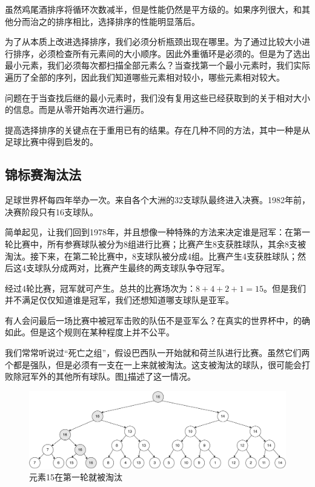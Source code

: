 \documentclass[b5paper]{ctexart}
\begin{document}
虽然鸡尾酒排序将循环次数减半，但是性能仍然是平方级的。如果序列很大，和其他分而治之的排序相比，选择排序的性能明显落后。

为了从本质上改进选择排序，我们必须分析瓶颈出现在哪里。为了通过比较大小进行排序，必须检查所有元素间的大小顺序。因此外重循环是必须的。但是为了选出最小元素，我们必须每次都扫描全部元素么？当查找第一个最小元素时，我们实际遍历了全部的序列，因此我们知道哪些元素相对较小，哪些元素相对较大。

问题在于当查找后继的最小元素时，我们没有复用这些已经获取到的关于相对大小的信息。而是从零开始再次进行遍历。

提高选择排序的关键点在于重用已有的结果。存在几种不同的方法，其中一种是从足球比赛中得到启发的。

\subsection{锦标赛淘汰法}

足球世界杯每四年举办一次。来自各个大洲的32支球队最终进入决赛。1982年前，决赛阶段只有16支球队\cite{wiki-wc}。

简单起见，让我们回到1978年，并且想像一种特殊的方法来决定谁是冠军：在第一轮比赛中，所有参赛球队被分为8组进行比赛；比赛产生8支获胜球队，其余8支被淘汰。接下来，在第二轮比赛中，8支球队被分成4组。比赛产生4支获胜球队；然后这4支球队分成两对，比赛产生最终的两支球队争夺冠军。

经过4轮比赛，冠军就可产生。总共的比赛场次为：$8+4+2+1 = 15$。但是我们并不满足仅仅知道谁是冠军，我们还想知道哪支球队是亚军。

有人会问最后一场比赛中被冠军击败的队伍不是亚军么？在真实的世界杯中，的确如此。但是这个规则在某种程度上并不公平。

我们常常听说过“死亡之组”，假设巴西队一开始就和荷兰队进行比赛。虽然它们两个都是强队，但是必须有一支在一上来就被淘汰。这支被淘汰的球队，很可能会打败除冠军外的其他所有球队。图\ref{fig:tournament-tree-1}描述了这一情况。

\begin{figure}[htbp]
  \centering
  \includegraphics[scale=0.6]{img/tournament-tree-1}
  \caption{元素15在第一轮就被淘汰}
  \label{fig:tournament-tree-1}
\end{figure}
\end{document}
